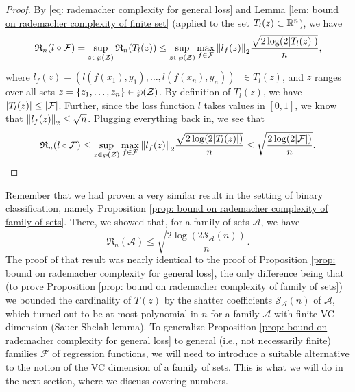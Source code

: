 \begin{proof}
By \eqref{eq: rademacher complexity for general loss} and Lemma \ref{lem: bound on rademacher complexity of finite set} (applied to the set $T_l(z) \subset \mathbb{R}^n$), we have
\[
    \mathfrak{R}_n(l \circ \mathcal{F}) = \sup_{z \in \operatorname{\wp}(\mathcal{Z})} \mathfrak{R}_n(T_l(z)) \leq \sup_{z \in \operatorname{\wp}(\mathcal{Z})} \max_{f \in \mathcal{F}} \norm{l_f(z)}_2 \frac{\sqrt{2 \log(2 \abs{T_l(z)})}}{n},
\]
where $l_f(z) = (l(f(x_1), y_1), \dots, l(f(x_n), y_n))^{\top} \in T_l(z)$, and $z$ ranges over all sets $z = \set{z_1, \dots, z_n} \in \power(\mathcal{Z})$. By definition of $T_l(z)$, we have $\abs{T_l(z)} \leq \abs{\mathcal{F}}$. Further, since the loss function $l$ takes values in $[0, 1]$, we know that $\norm{l_f(z)}_2 \leq \sqrt{n}$. Plugging everything back in, we see that
\[
    \mathfrak{R}_n(l \circ \mathcal{F}) \leq \sup_{z \in \operatorname{\wp}(\mathcal{Z})} \max_{f \in \mathcal{F}} \norm{l_f(z)}_2 \frac{\sqrt{2 \log(2 \abs{T_l(z)})}}{n} \leq \sqrt{\frac{2 \log(2 \abs{\mathcal{F}})}{n}}. \qedhere
\]
\end{proof}

Remember that we had proven a very similar result in the setting of binary classification, namely Proposition \ref{prop: bound on rademacher complexity of family of sets}. There, we showed that, for a family of sets $\mathcal{A}$, we have
\[
    \mathfrak{R}_n(\mathcal{A}) \leq \sqrt{\frac{2 \log(2 \mathcal{S}_{\mathcal{A}}(n))}{n}}.
\]
The proof of that result was nearly identical to the proof of Proposition \ref{prop: bound on rademacher complexity for general loss}, the only difference being that (to prove Proposition \ref{prop: bound on rademacher complexity of family of sets}) we bounded the cardinality of $T(z)$ by the shatter coefficients $\mathcal{S}_{\mathcal{A}}(n)$ of $\mathcal{A}$, which turned out to be at most polynomial in $n$ for a family $\mathcal{A}$ with finite VC dimension (Sauer-Shelah lemma). To generalize Proposition \ref{prop: bound on rademacher complexity for general loss} to general (i.e., not necessarily finite) families $\mathcal{F}$ of regression functions, we will need to introduce a suitable alternative to the notion of the VC dimension of a family of sets. This is what we will do in the next section, where we discuss covering numbers.
